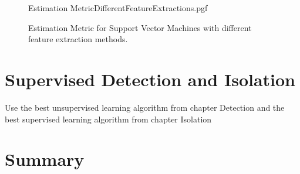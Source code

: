 \begin{figure}[!htb]
	\centering
	{Estimation MetricDifferentFeatureExtractions.pgf}
	
	\caption{Estimation Metric for Support Vector Machines with different feature extraction methods.}
	\label{fig:SVMCompareFeatureExtractions}
\end{figure}

\section{Supervised Detection and Isolation}
Use the best unsupervised learning algorithm from chapter Detection and the best supervised learning algorithm from chapter Isolation

\section{Summary}